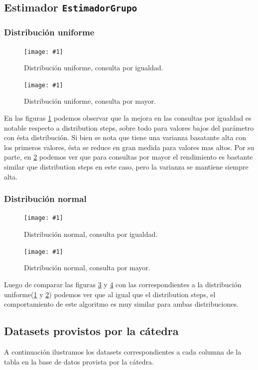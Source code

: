 \documentclass[a4paper, 10pt, twoside]{article}
\newcommand{\grafico}[3]{
  \begin{figure}[H]
    \texttt{[image: \#1]}
    \caption{#2}
    \label{#3}
  \end{figure}
}
\begin{document}
\subsection{Estimador \texttt{EstimadorGrupo}}

\subsubsection{Distribución uniforme}

\grafico{plot-custom-uniform-equal}
        {Distribución uniforme, consulta por igualdad.}
        {plot-custom-uniform-equal}
\grafico{plot-custom-uniform-greater}
        {Distribución uniforme, consulta por mayor.}
        {plot-custom-uniform-greater}

En las figuras \ref{plot-custom-uniform-equal} podemos observar que la mejora en las consultas por igualdad es notable respecto a distribution steps, 
sobre todo para valores bajos del parámetro con ésta distribución. Si bien se nota que tiene una varianza basatante alta con los primeros valores, ésta se reduce en gran medida para valores mas altos.
Por su parte, en \ref{plot-custom-uniform-greater} podemos ver que para consultas por mayor el rendimiento es bastante similar que distribution steps en este caso, pero la varianza se mantiene siempre alta.

\subsubsection{Distribución normal}        

\grafico{plot-custom-normal-equal}
        {Distribución normal, consulta por igualdad.}
        {plot-custom-normal-equal}
\grafico{plot-custom-normal-greater}
        {Distribución normal, consulta por mayor.}
        {plot-custom-normal-greater}

Luego de comparar las figuras \ref{plot-custom-normal-equal} y \ref{plot-custom-normal-greater} con las correspondientes a la distribución uniforme(\ref{plot-custom-uniform-equal} y \ref{plot-custom-uniform-greater}) podemos ver que al igual que el distribution steps, el comportamiento de este algoritmo es muy similar para ambas distribuciones.

\subsection{Datasets provistos por la cátedra}

A continuación ilustramos los datasets correspondientes a cada columna de la tabla en la base de datos provista por la cátedra.
\end{document}
